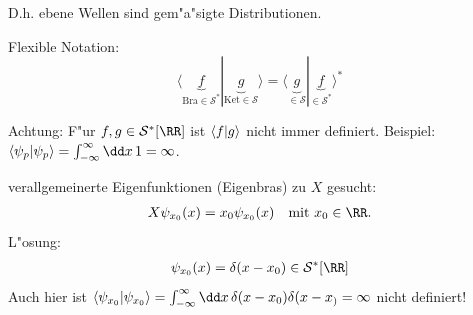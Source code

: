 \documentclass[a4paper]{scrartcl}
\begin{document}
{D.h. ebene Wellen sind gem"a"sigte Distributionen.

Flexible Notation:
$$\langle \underbrace{f}_{\mathrm{Bra}\in \mathcal S^*}  | \underbrace{g}_{\mathrm{Ket}\in\mathcal S} \rangle = \langle \underbrace{g}_{\in \mathcal S} | \underbrace{f}_{\in \mathcal S^*} \rangle^*$$

Achtung: F"ur $f,g \in \mathcal S^*[\RR]$ ist $\braket{ f|g}$ nicht immer definiert. Beispiel: $\braket{ \psi_p | \psi_p}  = \int_{-\infty}^\infty \dd x \, 1 = \infty$.

verallgemeinerte Eigenfunktionen (Eigenbras) zu $X$ gesucht:
\begin{align}X \psi_{x_0}(x) = x_0 \psi_{x_0}(x) \quad \mathrm{ mit \ } x_0 \in \RR.
\end{align}
L"osung:
\begin{align}
\psi_{x_0}(x) = \delta(x -x_0) \in \mathcal S^*[\RR]
\end{align}
Auch hier ist $\braket{ \psi_{x_0} | \psi_{x_0}} = \int_{-\infty}^\infty \dd x \, \delta(x-x_0) \delta(x-x_) = \infty$ nicht definiert!

}
\end{document}
